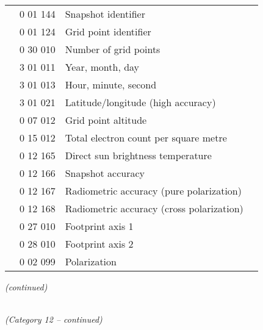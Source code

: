 \begin{longtable}[]{@{}llll@{}}
& 0 01 144 & Snapshot identifier &\tabularnewline
& 0 01 124 & Grid point identifier &\tabularnewline
& 0 30 010 & Number of grid points &\tabularnewline
& 3 01 011 & Year, month, day &\tabularnewline
& 3 01 013 & Hour, minute, second &\tabularnewline
& 3 01 021 & Latitude/longitude (high accuracy) &\tabularnewline
& 0 07 012 & Grid point altitude &\tabularnewline
& 0 15 012 & Total electron count per square metre &\tabularnewline
& 0 12 165 & Direct sun brightness temperature &\tabularnewline
& 0 12 166 & Snapshot accuracy &\tabularnewline
& 0 12 167 & Radiometric accuracy (pure polarization) &\tabularnewline
& 0 12 168 & Radiometric accuracy (cross polarization) &\tabularnewline
& 0 27 010 & Footprint axis 1 &\tabularnewline
& 0 28 010 & Footprint axis 2 &\tabularnewline
& 0 02 099 & Polarization &\tabularnewline
\bottomrule
\end{longtable}

\emph{(continued)}

\emph{\\
(Category 12 -- continued)}

